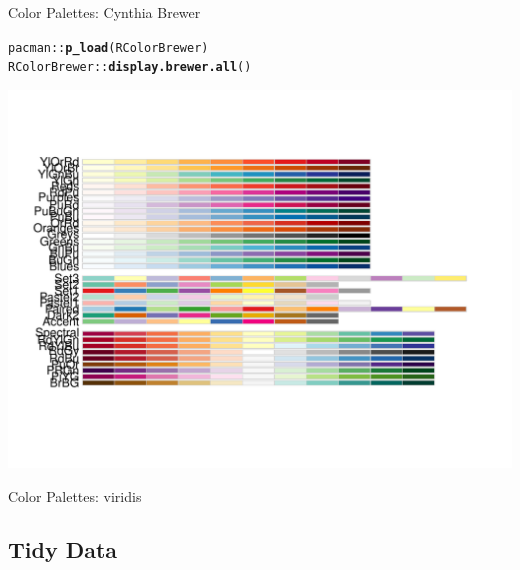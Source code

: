 \documentclass[10pt]{beamer}\usepackage[]{graphicx}\usepackage[]{color}
\makeatletter
\def\maxwidth{ %
  \ifdim\Gin@nat@width>\linewidth
    \linewidth
  \else
    \Gin@nat@width
  \fi
}
\newcommand{\hlopt}[1]{\textcolor[rgb]{0,0,0}{#1}}%
\newcommand{\hlstd}[1]{\textcolor[rgb]{0.345,0.345,0.345}{#1}}%
\newcommand{\hlkwd}[1]{\textcolor[rgb]{0.737,0.353,0.396}{\textbf{#1}}}%
\newenvironment{kframe}{%
 \def\at@end@of@kframe{}%
 \ifinner\ifhmode%
  \def\at@end@of@kframe{\end{minipage}}%
  \begin{minipage}{\columnwidth}%
 \fi\fi%
 \def\FrameCommand##1{\hskip\@totalleftmargin \hskip-\fboxsep
 \colorbox{shadecolor}{##1}\hskip-\fboxsep
     \hskip-\linewidth \hskip-\@totalleftmargin \hskip\columnwidth}%
 \MakeFramed {\advance\hsize-\width
   \@totalleftmargin\z@ \linewidth\hsize
   \@setminipage}}%
 {\par\unskip\endMakeFramed%
 \at@end@of@kframe}
\newenvironment{knitrout}{}{} %
\makeatother
\begin{document}
\begin{frame}[fragile]{Color Palettes: Cynthia Brewer}
	
\begin{knitrout}\tiny
{}\color{fgcolor}\begin{kframe}
\begin{alltt}
\hlstd{pacman}\hlopt{::}\hlkwd{p_load}\hlstd{(RColorBrewer)}
\hlstd{RColorBrewer}\hlopt{::}\hlkwd{display.brewer.all}\hlstd{()}
\end{alltt}
\end{kframe}

{\centering \includegraphics[width=\maxwidth]{figure/unnamed-chunk-4-1} 

}



\end{knitrout}
	
	
\end{frame}



\begin{frame}[fragile]{Color Palettes: viridis}
	
	
	
	
	
\end{frame}

\subsection{Tidy Data}
\end{document}
